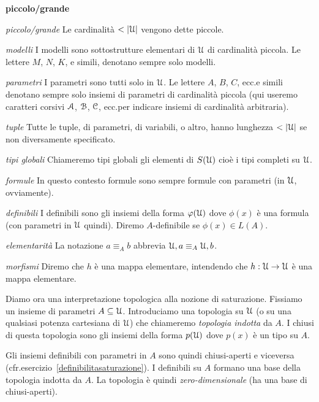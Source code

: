 \begin{litemize}{{\bf piccolo/grande}}
\item[\emph{piccolo/grande}] Le cardinalit\`a $<|\U|$ vengono dette piccole. 
\item[\emph{modelli}] I modelli sono sottostrutture elementari di $\EuScript U$ di cardinalit\`a piccola. Le lettere $M$, $N$, $K$, e simili, denotano sempre solo modelli.
\item[\emph{parametri}] I parametri sono tutti solo in $\EuScript U$. Le lettere $A$, $B$, $C$, ecc.\@ e simili denotano sempre solo insiemi di parametri di cardinalit\`a piccola (qui useremo caratteri corsivi $\EuScript A$, $\EuScript B$, $\EuScript C$, ecc.\@ per indicare insiemi di cardinalit\`a arbitraria).
\item[\emph{tuple}] Tutte le tuple, di parametri, di variabili, o altro, hanno lunghezza $<|\U|$ se non diversamente specificato.
\item[\emph{tipi globali}] Chiameremo tipi globali gli elementi di $S(\EuScript U)$ cio\`e i tipi completi su $\EuScript U$.
\item[\emph{formule}] In questo contesto formule sono sempre formule con parametri (in $\EuScript U$, ovviamente).
\item[\emph{definibili}] I definibili sono gli insiemi della forma $\varphi(\EuScript U)$ dove $\phi(x)$ \`e una formula (con parametri in $\EuScript U$ quindi). Diremo $A$-definibile se $\phi(x)\in L(A)$.
\item[\emph{elementarit\`a}] La notazione $a\equiv_A b$ abbrevia $\EuScript U,a \equiv_A \EuScript U,b$. 
\item[\emph{morfismi}]  Diremo che $h$ \`e una mappa elementare, intendendo che $h:\EuScript U\rightarrow\EuScript U$ \`e una mappa elementare.
\end{litemize}


Diamo ora una interpretazione topologica alla nozione di saturazione. Fissiamo un insieme di parametri $A\subseteq \EuScript U$. Introduciamo una topologia su $\EuScript U$ (o su una qualsiasi potenza cartesiana di $\EuScript U$) che chiameremo \emph{topologia indotta\/} da $A$. I chiusi di questa topologia sono gli insiemi della forma $p(\EuScript U)$ dove $p(x)$ \`e un tipo su $A$. 

Gli insiemi definibili con parametri in $A$ sono quindi chiusi-aperti e viceversa (cfr.\@ esercizio~\ref{definibilitasaturazione}). I definibili su  $A$ formano una base della topologia indotta da $A$. La topologia \`e quindi \emph{zero-dimensionale\/} (ha una base di chiusi-aperti). 


